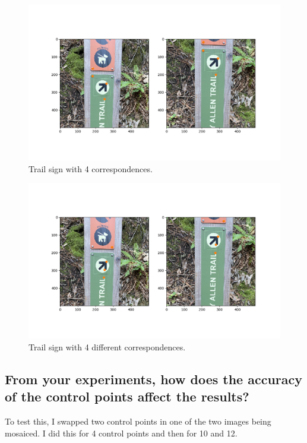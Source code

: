 \documentclass[]{article}
\begin{document}
		\begin{figure}[H]
			\centering
			\includegraphics[width=6.5in]{test_images/sign_4_correspondences.png}
			\caption{Trail sign with 4 correspondences.}
		\end{figure}
		
		\begin{figure}[H]
			\centering
			\includegraphics[width=6.5in]{test_images/sign_4_1_correspondences.png}
			\caption{Trail sign with 4 different correspondences.}
		\end{figure}
		
	\subsection{From your experiments, how does the accuracy of the control points affect the results?}
		To test this, I swapped two control points in one of the two images being mosaiced. I did this for 4 control points and then for 10 and 12. 
\end{document}
